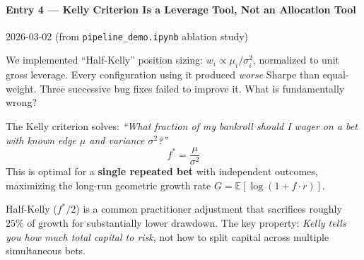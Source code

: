 \documentclass[a4paper, 11pt]{report}
\theoremstyle{definition}
\theoremstyle{remark}
\begin{document}
\paragraph{Entry 4 --- Kelly Criterion Is a Leverage Tool, Not an Allocation Tool}
\label{exp:kelly-lesson}
\begin{description}[style=nextline, leftmargin=1.8cm]
    \item[Date] 2026-03-02 \quad (from \texttt{pipeline\_demo.ipynb} ablation study)

    \item[Question]
        We implemented ``Half-Kelly'' position sizing:
        $w_i \propto \mu_i / \sigma_i^2$, normalized to unit gross leverage.
        Every configuration using it produced \emph{worse} Sharpe than
        equal-weight.  Three successive bug fixes failed to improve it.
        What is fundamentally wrong?

    \item[Background --- The Kelly Formula]
        The Kelly criterion solves: \emph{``What fraction of my bankroll
        should I wager on a bet with known edge $\mu$ and variance
        $\sigma^2$?''}
        \[
            f^* = \frac{\mu}{\sigma^2}
        \]
        This is optimal for a \textbf{single repeated bet} with
        independent outcomes, maximizing the long-run geometric growth
        rate $G = \mathbb{E}[\log(1 + f \cdot r)]$.

        Half-Kelly ($f^*/2$) is a common practitioner adjustment that
        sacrifices roughly $25\%$ of growth for substantially lower
        drawdown.  The key property: \emph{Kelly tells you how much
        total capital to risk}, not how to split capital across
        multiple simultaneous bets.


\end{description}
\end{document}
